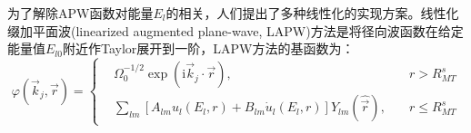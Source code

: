 为了解除APW函数对能量$E_l$的相关，人们提出了多种线性化的实现方案\cite{PRB2-3098_1970,PRB2-290_1970,JPF9-661_1979,PRB19-6094_1979}。线性化缀加平面波(linearized augmented plane-wave, LAPW)方法是将径向波函数在给定能量值$E_{l0}$附近作Taylor展开到一阶\cite{PRB12-3060_1975}，LAPW方法的基函数为：
\begin{equation}
  \varphi(\vec k_j,\vec r)=\left\{
  \begin{aligned}
	  &\Omega_0^{-1/2}\exp(\mathrm{i}\vec k_j\cdot\vec r),&r>R_{MT}^s\\
    &\sum_{lm}[A_{lm}u_l(E_l,r)+B_{lm}\dot u_l(E_l,r)]Y_{lm}(\hat{\vec r}),\quad&r\leqslant R_{MT}^s
  \end{aligned}\right.
  \label{eq:LAPW-basis}
\end{equation}
